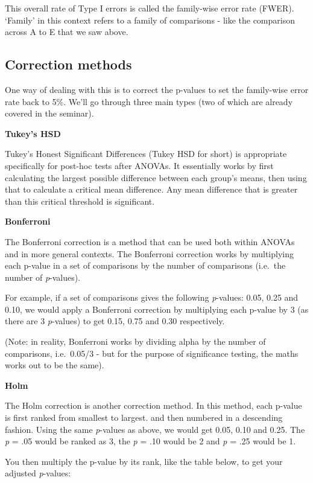 \documentclass[
]{book}
\begin{document}
This overall rate of Type I errors is called the family-wise error rate
(FWER). `Family' in this context refers to a family of comparisons -
like the comparison across A to E that we saw above.

\subsection{Correction methods}\label{correction-methods}

One way of dealing with this is to correct the p-values to set the
family-wise error rate back to 5\%. We'll go through three main types
(two of which are already covered in the seminar).

\textbf{Tukey's HSD}

Tukey's Honest Significant Differences (Tukey HSD for short) is
appropriate specifically for post-hoc tests after ANOVAs. It essentially
works by first calculating the largest possible difference between each
group's means, then using that to calculate a critical mean difference.
Any mean difference that is greater than this critical threshold is
significant.

\textbf{Bonferroni}

The Bonferroni correction is a method that can be used both within
ANOVAs and in more general contexts. The Bonferroni correction works by
multiplying each p-value in a set of comparisons by the number of
comparisons (i.e.~the number of \emph{p}-values).

For example, if a set of comparisons gives the following \emph{p}-values: 0.05,
0.25 and 0.10, we would apply a Bonferroni correction by multiplying
each p-value by 3 (as there are 3 \emph{p}-values) to get 0.15, 0.75 and 0.30
respectively.

(Note: in reality, Bonferroni works by dividing alpha by the number of
comparisons, i.e.~0.05/3 - but for the purpose of significance testing,
the maths works out to be the same).

\textbf{Holm}

The Holm correction is another correction method. In this method, each
p-value is first ranked from smallest to largest. and then numbered in a
descending fashion. Using the same \emph{p}-values as above, we would get 0.05,
0.10 and 0.25. The \emph{p} = .05 would be ranked as 3, the \emph{p} = .10 would be 2
and \emph{p} = .25 would be 1.

You then multiply the p-value by its rank, like the table below, to get
your adjusted \emph{p}-values:
\end{document}
